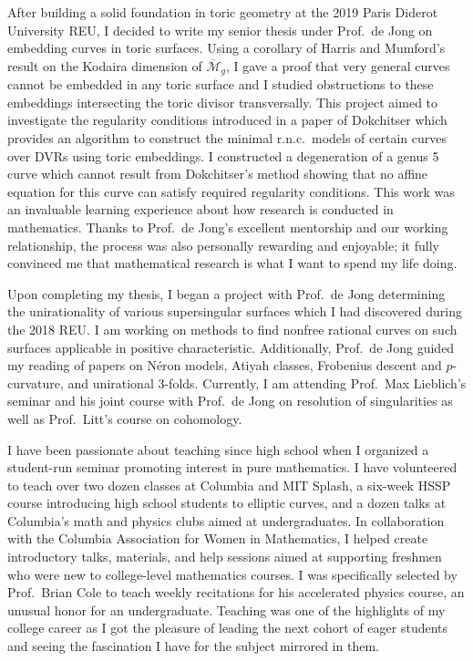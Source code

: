 \documentclass[11pt]{article}
\begin{document}
\par
After building a solid foundation in toric geometry at the 2019 Paris Diderot University REU, I decided to write my senior thesis under Prof.\ de Jong on embedding curves in toric surfaces. Using a corollary of Harris and Mumford's result on the Kodaira dimension of $\overline{\mathcal{M}}_g$, I gave a proof that very general curves cannot be embedded in any toric surface and I studied obstructions to these embeddings intersecting the toric divisor transversally. This project aimed to investigate the regularity conditions introduced in a paper of Dokchitser  which provides an algorithm to construct the minimal r.n.c.\ models of certain curves over DVRs using toric embeddings. I constructed a degeneration of a genus 5 curve which cannot result from Dokchitser's method showing that no affine equation for this curve can satisfy required regularity conditions. This work was an invaluable learning experience about how research is conducted in mathematics. Thanks to Prof.\ de Jong’s excellent mentorship and our working relationship, the process was also personally rewarding and enjoyable; it fully convinced me that mathematical research is what I want to spend my life doing. 
\par 
Upon completing my thesis, I began a project with Prof.\ de Jong determining the unirationality of various supersingular surfaces which I had discovered during the 2018 REU.  I am working on methods to find nonfree rational curves on such surfaces applicable in positive characteristic. Additionally, Prof.\ de Jong guided my reading of papers on N\'{e}ron models, Atiyah classes, Frobenius descent and $p$-curvature, and unirational $3$-folds. Currently, I am attending Prof.\ Max Lieblich's seminar and his joint course with Prof.\ de Jong on resolution of singularities as well as Prof.\ Litt's course on \etale cohomology.
\par
I have been passionate about teaching since high school when I organized a student-run seminar promoting interest in pure mathematics. I have volunteered to teach over two dozen classes at Columbia and MIT Splash, a six-week HSSP course introducing high school students to elliptic curves, and a dozen talks at Columbia's math and physics clubs aimed at undergraduates. In collaboration with the Columbia Association for Women in Mathematics, I helped create introductory talks, materials, and help sessions aimed at supporting freshmen who were new to college-level mathematics courses. I was specifically selected by Prof.\ Brian Cole to teach weekly recitations for his accelerated physics course, an unusual honor for an undergraduate. Teaching was one of the highlights of my college career as I got the pleasure of leading the next cohort of eager students and seeing the fascination I have for the subject mirrored in them.
\end{document}
